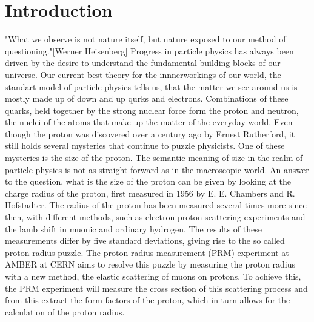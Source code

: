 \chapter{Introduction} \label{chap:introduction}
"What we observe is not nature itself, but nature exposed to our method of questioning."[Werner Heisenberg]\autocite{Heisenberg1958}
\newline
Progress in particle physics has always been driven by the desire to understand the fundamental building blocks of our universe.
\newline Our current best theory for the innnerworkings of our world,
the standart model of particle physics tells us, that the matter we see around us is mostly made up of down and up qurks and electrons.
Combinations of these quarks, held together by the strong nuclear force form the proton and neutron, the nuclei of the atoms that make up the matter of the everyday world.
Even though the proton was discovered over a century ago by Ernest Rutherford\autocite{discoveryProton}, it still holds several mysteries that continue to puzzle physicists.
One of these mysteries is the size of the proton.
\newline
The semantic meaning of size in the realm of particle physics is not as straight forward as in the macroscopic world. An answer to the question,
what is the size of the proton can be given by looking at the charge radius of the proton, first measured in 1956 by E. E. Chambers and R. Hofstadter.\autocite{Hofstadter1956}
\newline
The radius of the proton has been measured several times more since then, with different methods, such as electron-proton scattering experiments and the lamb shift in muonic and ordinary hydrogen.
The results of these measurements differ by five standard deviations, giving rise to the so called proton radius puzzle.\autocite{ProposalAmber}
\newline
The proton radius measurement (PRM) experiment at AMBER at CERN aims to resolve this puzzle by measuring the proton radius with a new method,
 the elastic scattering of muons on protons.
\newline
To achieve this, the PRM experiment will measure the cross section of this scattering process and from this extract the form factors of the proton, which in turn allows for the calculation of the proton radius.
\newline
